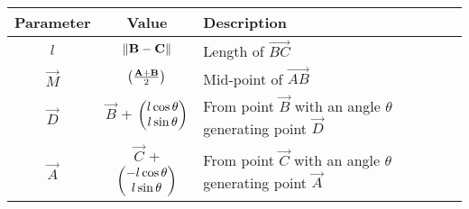 \begin{tabular}{|c|c|p{5cm}|}
\hline
\textbf{Parameter} & \textbf{Value} & \textbf{Description} \\
\hline
	$l$ & $\left\lVert\mathbf{B}-\mathbf{C}\right\rVert$ & Length of $\vec{BC}$ \\
\hline
	$\vec{M}$ & $\left(\frac{\mathbf{A+B}}{2}\right)$ & Mid-point of $\vec{AB}$ \\
\hline
    $\vec{D}$ & $\vec{B}$ + $\begin{pmatrix}l \cos \theta  \\ l \sin \theta\end{pmatrix}$ & From point $\vec{B}$ with an angle $\theta$ generating  point $\vec{D}$  \\
\hline
	$\vec{A}$ & $\vec{C}$ + $\begin{pmatrix}-l \cos \theta  \\ l \sin \theta\end{pmatrix}$ & From point $\vec{C}$ with an angle $\theta$ generating point $\vec{A}$  \\  
\hline       
\end{tabular}
